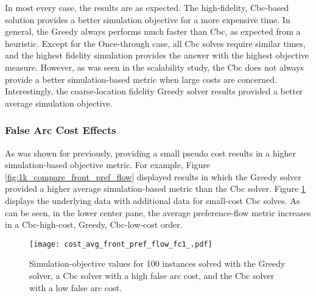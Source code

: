 In most every case, the results are as expected. The high-fidelity, Cbc-based
solution provides a better simulation objective for a more expensive time. In
general, the Greedy always performs much faster than Cbc, as expected from a
heuristic. Except for the Once-through case, all Cbc solves require similar
times, and the highest fidelity simulation provides the answer with the highest
objective measure. However, as was seen in the scalability study, the Cbc does
not always provide a better simulation-based metric when large costs are
concerned. Interestingly, the coarse-location fidelity Greedy solver results
provided a better average simulation objective.

\subsubsection{False Arc Cost Effects}

As was shown for previously, providing a small pseudo cost results in a higher
simulation-based objective metric. For example, Figure
\ref{fig:1k_compare_front_pref_flow} displayed results in which the Greedy
solver provided a higher average simulation-based metric than the Cbc
solver. Figure \ref{fig:cost_avg_front_pref_flow_fc1_} displays the underlying
data with additional data for small-cost Cbc solves. As can be seen, in the
lower center pane, the average preference-flow metric increases in a
Cbc-high-cost, Greedy, Cbc-low-cost order.

\begin{figure}[h!]
  \begin{center}
    \texttt{[image: cost\_avg\_front\_pref\_flow\_fc1\_.pdf]}
    \caption[]{
      \label{fig:cost_avg_front_pref_flow_fc1_}
      Simulation-objective values for 100 instances solved with the Greedy
      solver, a Cbc solver with a high false arc cost, and the Cbc solver with a
      low false arc cost.}
  \end{center}
\end{figure}




